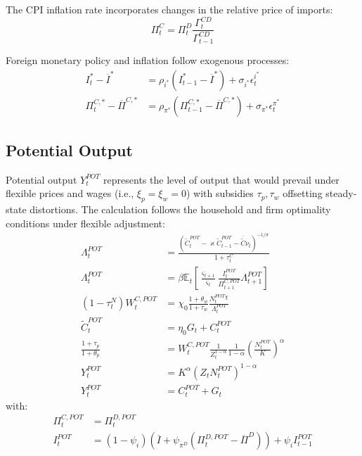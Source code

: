 \documentclass[12pt]{article}
\begin{document}
The CPI inflation rate incorporates changes in the relative price of imports:
\begin{equation}
\Pi_t^C = \Pi_t^D \frac{\Gamma_t^{CD}}{\Gamma_{t-1}^{CD}}
\end{equation}

Foreign monetary policy and inflation follow exogenous processes:
\begin{align}
I_t^* - \overline{I}^* &= \rho_{i^*} (I_{t-1}^* - \overline{I}^*) + \sigma_{i^*} \epsilon_t^{i^*} \\
\Pi_t^{C,*} - \overline{\Pi}^{C,*} &= \rho_{\pi^*} (\Pi_{t-1}^{C,*} - \overline{\Pi}^{C,*}) + \sigma_{\pi^*} \epsilon_t^{\pi^*}
\end{align}

\subsection{Potential Output}\label{sec:potential}

Potential output $Y_t^{POT}$ represents the level of output that would prevail under flexible prices and wages (i.e., $\xi_p = \xi_w = 0$) with subsidies $\tau_p, \tau_w$ offsetting steady-state distortions. The calculation follows the household and firm optimality conditions under flexible adjustment:
\begin{align}
\Lambda_t^{POT} &= \frac{(\tilde{C}_t^{POT} - \varkappa \tilde{C}_{t-1}^{POT} - \overline{\tilde{C}} \nu_t)^{-1/\sigma}}{1 + \tau_t^C} \\
\Lambda_t^{POT} &= \beta \mathbb{E}_t \left[ \frac{\varsigma_{t+1}}{\varsigma_t} \frac{I_t^{POT}}{\Pi_{t+1}^{C,POT}} \Lambda_{t+1}^{POT} \right] \\
(1-\tau_t^N) W_t^{C,POT} &= \chi_0 \frac{1+\theta_w}{1+\tau_w} \frac{N_t^{POT}{}^{\chi}}{\Lambda_t^{POT}} \\
\tilde{C}_t^{POT} &= \eta_0 G_t + C_t^{POT} \\
\frac{1+\tau_p}{1+\theta_p} &= W_t^{C,POT} \frac{1}{Z_t^{1-\alpha}} \frac{1}{1-\alpha} \left(\frac{N_t^{POT}}{K}\right)^\alpha \\
Y_t^{POT} &= K^\alpha (Z_t N_t^{POT})^{1-\alpha} \\
Y_t^{POT} &= C_t^{POT} + G_t
\end{align}
with:
\begin{align}
\Pi_t^{C,POT} &= \Pi_t^{D,POT} \\
I_t^{POT} &= (1-\psi_i) (\overline{I} + \psi_{\pi^D} (\Pi_t^{D,POT} - \overline{\Pi}^D)) + \psi_i I_{t-1}^{POT}
\end{align}
\end{document}

